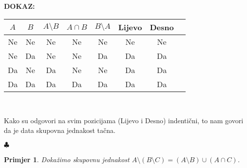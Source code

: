 \documentclass{article}
\newtheorem{primjer}{Primjer}
\newenvironment{dokaz}
    {\noindent\textbf{DOKAZ:}\\} {\hfill $\clubsuit$}
\begin{document}
\begin{dokaz}
    \begin{tabularx}{10cm}{|c|c|c|c|c|c|c|c}
    $A$ & $B$ & $A\setminus B$ & $A\cap B$ & $B\setminus A$ & Lijevo & Desno & \\\hline
    Ne & Ne & Ne & Ne & Ne & Ne & Ne & \\\hline
    Ne & Da & Ne & Ne & Da & Da & Da & \\\hline
    Da & Ne & Da & Ne & Ne & Da & Da & \\\hline
    Da & Da & Da & Da & Da & Da & Da & \\\hline
    \end{tabularx}\\
    \smallskip
    
    \noindent
    Kako su odgovori na svim pozicijama (Lijevo i Desno) indentični, to nam govori da je data skupovna jednakost tačna.


\end{dokaz}

\newpage
\begin{primjer}
    Dokažimo skupovnu jednakost $A\setminus (B\setminus C)=(A\setminus B)\cup (A\cap C)$.
\end{primjer}
\end{document}
